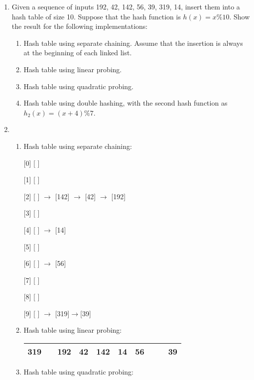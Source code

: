 \documentclass[12pt,a4paper]{article}
\makeatletter
\newtheorem*{solution}{Solution}
\theoremstyle{definition}
\renewenvironment{solution}[1][Solution] {\par\pushQED{\qed}\normalfont\topsep6\p@\@plus6\p@\relax\trivlist\item[\hskip\labelsep\bfseries#1\@addpunct{.}]\ignorespaces}{\popQED\endtrivlist\@endpefalse} \makeatother
\makeatother
\begin{document}
\begin{enumerate}

\item  Given a sequence of inputs 192, 42, 142, 56, 39, 319, 14, insert them
into a hash table of size 10. Suppose that the hash function is $h(x) = x\%10$. Show the
result for the following implementations:
	\begin{enumerate}
	\item Hash table using separate chaining. Assume that the insertion is always at the
beginning of each linked list.
	\item Hash table using linear probing.
	\item Hash table using quadratic probing.
	\item Hash table using double hashing, with the second hash function as $h_2 (x) = (x+4)\%7$.
	\end{enumerate}

\begin{solution}
	~\\
		\begin{enumerate}
		\item Hash table using separate chaining:
		
		[0] [  ] 
		
		[1] [  ]
				
		[2] [  ] $\rightarrow$ [142] $\rightarrow$ [42] $\rightarrow$ [192]
						
		[3] [  ]
		
		[4] [  ] $\rightarrow$ [14]
		
		[5] [  ]
		
		[6] [  ] $\rightarrow$ [56]
		
		[7] [  ]
		
		[8] [  ]
		
		[9] [  ] $\rightarrow$ [319]$\rightarrow$[39]


		\item Hash table using linear probing:
		
\begin{table}[ht]
	\centering
	\begin{tabular}{|c|c|c|c|c|c|c|c|c|c|}
		\hline
		
		319 &  & 192 & 42 & 142 & 14 & 56 &  &  & 39 \\ \hline 
		
	\end{tabular}
\end{table}
		
		\item Hash table using quadratic probing:
		

\end{enumerate}
\end{solution}
\end{enumerate}
\end{document}
